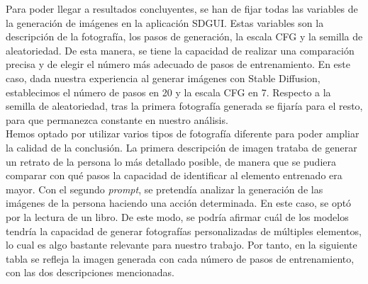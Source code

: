 Para poder llegar a resultados concluyentes, se han de fijar todas las variables de la generación de imágenes en la aplicación SDGUI. Estas variables son la descripción de la fotografía, los pasos de generación, la escala CFG y la semilla de aleatoriedad. De esta manera, se tiene la capacidad de realizar una comparación precisa y de elegir el número más adecuado de pasos de entrenamiento. En este caso, dada nuestra experiencia al generar imágenes con Stable Diffusion, establecimos el número de pasos en 20 y la escala CFG en 7. Respecto a la semilla de aleatoriedad, tras la primera fotografía generada se fijaría para el resto, para que permanezca constante en nuestro análisis.\\

Hemos optado por utilizar varios tipos de fotografía diferente para poder ampliar la calidad de la conclusión. La primera descripción de imagen trataba de generar un retrato de la persona lo más detallado posible, de manera que se pudiera comparar con qué pasos la capacidad de identificar al elemento entrenado era mayor. Con el segundo \textit{prompt}, se pretendía analizar la generación de las imágenes de la persona haciendo una acción determinada. En este caso, se optó por la lectura de un libro. De este modo, se podría afirmar cuál de los modelos tendría la capacidad de generar fotografías personalizadas de múltiples elementos, lo cual es algo bastante relevante para nuestro trabajo. Por tanto, en la siguiente tabla se refleja la imagen generada con cada número de pasos de entrenamiento, con las dos descripciones mencionadas.\\


